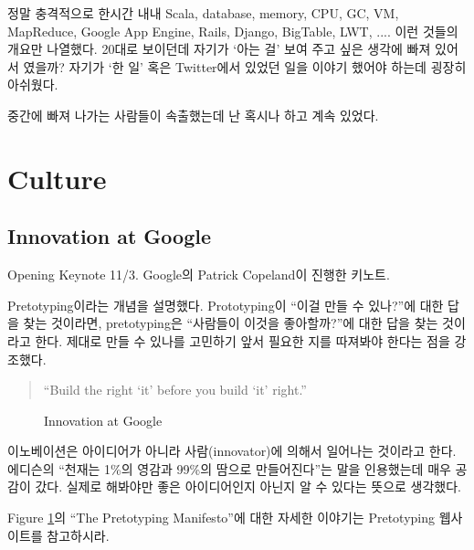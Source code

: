 \documentclass[11pt]{article}
\begin{document}
정말 충격적으로 한시간 내내 Scala, database, memory, CPU, GC, VM,
MapReduce, Google App Engine, Rails, Django, BigTable, LWT, .... 이런
것들의 개요만 나열했다. 20대로 보이던데 자기가 `아는 걸' 보여 주고 싶은 
생각에 빠져 있어서 였을까? 자기가 `한 일' 혹은 Twitter에서 있었던 일을  
이야기 했어야 하는데 굉장히 아쉬웠다.

중간에 빠져 나가는 사람들이 속출했는데 난 혹시나 하고 계속 있었다. 

\section{Culture}

\subsection{Innovation at Google}
Opening Keynote 11/3. Google의 Patrick Copeland이 진행한 키노트.

Pretotyping\cite{pretotype}이라는 개념을 설명했다.
Prototyping이 ``이걸 만들 수 있나?''에 대한 답을 찾는 
것이라면, pretotyping은 ``사람들이 이것을 좋아할까?''에 대한 답을 찾는 
것이라고 한다. 제대로 만들 수 있나를 고민하기 앞서 필요한 지를 따져봐야 
한다는 점을 강조했다.

\begin{quote}
``Build the right `it' before you build `it' right.''
\end{quote}

\begin{figure}[t]
    \begin{Frame}
        \begin{center}
        \end{center}
    \end{Frame}
    \caption{Innovation at Google}
    \label{pretotyping}
\end{figure}

이노베이션은 아이디어가 아니라 사람(innovator)에 의해서 일어나는 것이라고 한다. 
에디슨의 ``천재는 1\%의 영감과 99\%의 땀으로 만들어진다''는 말을
인용했는데 매우 공감이 갔다. 실제로 해봐야만 좋은 아이디어인지 아닌지 
알 수 있다는 뜻으로 생각했다.

Figure \ref{pretotyping}의 ``The Pretotyping Manifesto''에 대한 자세한 
이야기는 Pretotyping 웹사이트를 참고하시라.
\end{document}
